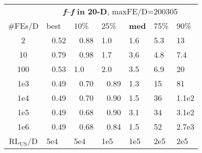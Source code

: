 \begin{tabular}{c|llllll}
 & \multicolumn{6}{|c}{\textbf{\textit{f}\raisebox{-0.35ex}{1}--\textit{f}\raisebox{-0.35ex}{24} in 20-D}, maxFE/D=200305}\\
\#FEs/D & best & 10\% & 25\% & \textbf{med} & 75\% & 90\%\\
2 & ~\,0.52 & ~\,0.88 & \hspace*{1ex}1.0 & \hspace*{1ex}1.6 & \hspace*{1ex}5.3 & 13\\
10 & ~\,0.79 & ~\,0.98 & \hspace*{1ex}1.7 & \hspace*{1ex}3.6 & \hspace*{1ex}4.8 & \hspace*{1ex}7.4\\
100 & ~\,0.53 & \hspace*{1ex}1.0 & \hspace*{1ex}2.0 & \hspace*{1ex}3.5 & \hspace*{1ex}6.9 & 20\\
1e3 & ~\,0.49 & ~\,0.70 & ~\,0.89 & \hspace*{1ex}1.3 & 15 & 81\\
1e4 & ~\,0.49 & ~\,0.70 & ~\,0.90 & \hspace*{1ex}1.5 & 36 & 1.1e2\\
1e5 & ~\,0.49 & ~\,0.68 & ~\,0.90 & \hspace*{1ex}3.1 & 34 & 3.1e2\\
1e6 & ~\,0.49 & ~\,0.68 & ~\,0.84 & \hspace*{1ex}1.5 & 52 & 2.7e3\\
$\text{RL}_{\text{US}}$/D & 5e4 & 5e4 & 1e5 & 1e5 & 2e5 & 2e5
\end{tabular}
